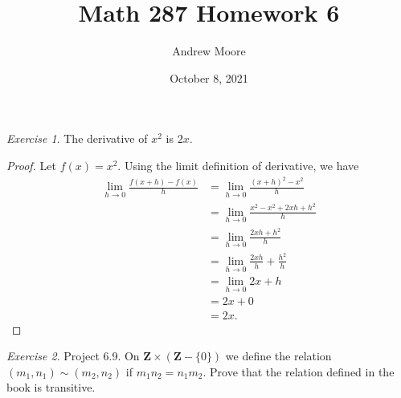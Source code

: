 \documentclass[12pt,oneside]{amsart}
\title{Math 287 Homework 6}
\author{Andrew Moore}
\date{October 8, 2021} %
\theoremstyle{remark}
\newtheorem{exer}{Exercise}
\newcommand{\bfZ}{\mathbf{Z}}
\begin{document}
\maketitle

%
%
%
%
\newpage
\begin{exer}
The derivative of $x^2$ is $2x$.
\end{exer}
\begin{proof}
Let $f(x) = x^2$.
Using the limit definition of derivative, we have
\begin{equation}
\begin{split}
  \lim_{h \to 0} \frac{f(x+h) - f(x)}{h} &= \lim_{h \to 0} \frac{(x + h)^2 - x^2}{h} \\
                                         &= \lim_{h \to 0} \frac{x^2 - x^2 + 2xh + h^2}{h} \\
                                         &= \lim_{h \to 0} \frac{2xh + h^2}{h} \\
                                         &= \lim_{h \to 0} \frac{2xh}{h} + \frac{h^2}{h} \\
                                         &= \lim_{h \to 0} 2x + h \\
                                         &= 2x + 0 \\
                                         &= 2x.
\end{split}
\end{equation}
\end{proof}

%
%
%
%
\newpage
\begin{exer}
Project 6.9. On $\bfZ \times (\bfZ - \{0\})$ we define the relation $(m_1, n_1) \sim (m_2, n_2)$ if $m_1n_2 = n_1m_2$. Prove that the relation defined in the book is transitive.
%
%
\end{exer}
\end{document}
